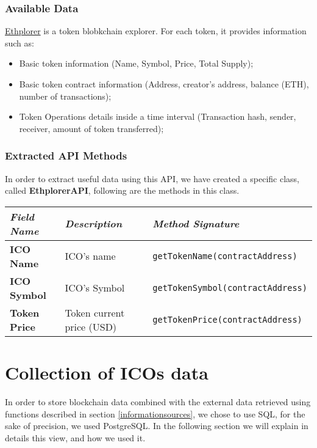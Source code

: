 \subsubsection{Available Data}
\href{https://ethplorer.io/}{Ethplorer} is a token blobkchain explorer. For each token, it provides information such as:
\begin{itemize}
    \item Basic token information (Name, Symbol, Price, Total Supply);
    \item Basic token contract information (Address, creator's address, balance (ETH), number of transactions);
    \item Token Operations details inside a time interval (Transaction hash, sender, receiver, amount of token transferred);
\end{itemize}
\subsubsection{Extracted API Methods}
In order to extract useful data using this API, we have created a specific class, called \textbf{EthplorerAPI}, following are the methods in this class.
\begin{center}
\begin{tabular}{| C{2cm} | C{4cm} | C{7cm} |} \hline
    \textit{Field Name} & \textit{Description} & \textit{Method Signature}\\ \hline
    \textbf{ICO Name} & ICO's name & \texttt{getTokenName(contractAddress)}\\ \hline 
    \textbf{ICO Symbol} & ICO's Symbol & \texttt{getTokenSymbol(contractAddress)}\\ \hline 
    \textbf{Token Price} & Token current price (USD) & \texttt{getTokenPrice(contractAddress)}\\ \hline
\end{tabular}
\end{center}

\section{Collection of ICOs data}
In order to store blockchain data combined with the external data retrieved using functions described in section \ref{informationsources}, we chose to use SQL, for the sake of precision, we used PostgreSQL.
In the following section we will explain in details this view, and how we used it.

